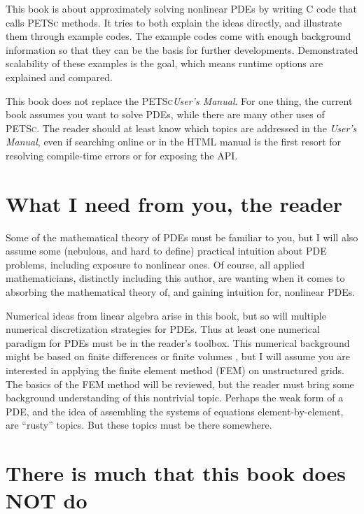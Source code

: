 \documentclass{tufte-book}
\theoremstyle{definition}
\newcommand{\PETSc}{\textsc{PETSc}\xspace}
\begin{document}
This book is about approximately solving nonlinear PDEs by writing C code that calls \PETSc methods.  It tries to both explain the ideas directly, and illustrate them through example codes.  The example codes come with enough background information so that they can be the basis for further developments.  Demonstrated scalability of these examples is the goal, which means runtime options are explained and compared.

This book does not replace the \PETSc \emph{User's Manual}.  For one thing, the current book assumes you want to solve PDEs, while there are many other uses of \PETSc.  The reader should at least know which topics are addressed in the \emph{User's Manual}, even if searching online or in the HTML manual is the first resort for resolving compile-time errors or for exposing the API.

\section{What I need from you, the reader}

Some of the mathematical theory of PDEs must be familiar to you, but I will also assume some (nebulous, and hard to define) practical intuition about PDE problems, including exposure to nonlinear ones.  Of course, all applied mathematicians, distinctly including this author, are wanting when it comes to absorbing the mathematical theory of, and gaining intuition for, nonlinear PDEs.

Numerical ideas from linear algebra \citep{TrefethenBau} arise in this book, but so will multiple numerical discretization strategies for PDEs.  Thus at least one numerical paradigm for PDEs must be in the reader's toolbox.  This numerical background might be based on finite differences \citep{MortonMayers} or finite volumes \citep{LeVeque}, but I will assume you are interested in applying the finite element method (FEM) on unstructured grids.  The basics of the FEM method will be reviewed, but the reader must bring some background understanding of this nontrivial topic.  Perhaps the weak form of a PDE, and the idea of assembling the systems of equations element-by-element, are ``rusty'' topics.  But these topics must be there somewhere.

\section{There is much that this book does NOT do}
\end{document}
